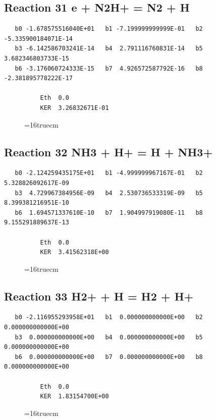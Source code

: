 \documentclass[12pt,dvipdfm]{article}
\begin{document}
\subsection{
Reaction 31 e + N2H+ = N2 + H }
\begin{small}\begin{verbatim}
   b0 -1.678575516040E+01   b1 -7.199999999999E-01   b2 -5.335900184071E-14
   b3 -6.142586703241E-14   b4  2.791116760831E-14   b5  3.682346803733E-15
   b6 -3.176060724333E-15   b7  4.926572587792E-16   b8 -2.381895778222E-17

          Eth  0.0
          KER  3.26832671E-01

\end{verbatim}\end{small}
\begin{figure}[h!] \label{n2rates}
\epsfxsize=16truecm
\end{figure}
\newpage

\subsection{
Reaction 32 NH3 + H+ = H + NH3+ }
\begin{small}\begin{verbatim}
   b0 -2.124259435175E+01   b1 -4.999999967167E-01   b2  5.328826092617E-09
   b3  4.729967384956E-09   b4  2.530736533319E-09   b5  8.399381216951E-10
   b6  1.694571337610E-10   b7  1.904997919080E-11   b8  9.155291889637E-13

          Eth  0.0
          KER  3.41562318E+00

\end{verbatim}\end{small}
\begin{figure}[h!] \label{n2rates}
\epsfxsize=16truecm
\end{figure}
\newpage

\subsection{
Reaction 33 H2+ + H = H2 + H+ }
\begin{small}\begin{verbatim}
   b0 -2.116955293958E+01   b1  0.000000000000E+00   b2  0.000000000000E+00
   b3  0.000000000000E+00   b4  0.000000000000E+00   b5  0.000000000000E+00
   b6  0.000000000000E+00   b7  0.000000000000E+00   b8  0.000000000000E+00

          Eth  0.0
          KER  1.83154700E+00
\end{verbatim}\end{small}
\begin{figure}[h!] \label{n2rates}
\epsfxsize=16truecm
\end{figure}
\newpage
\end{document}
